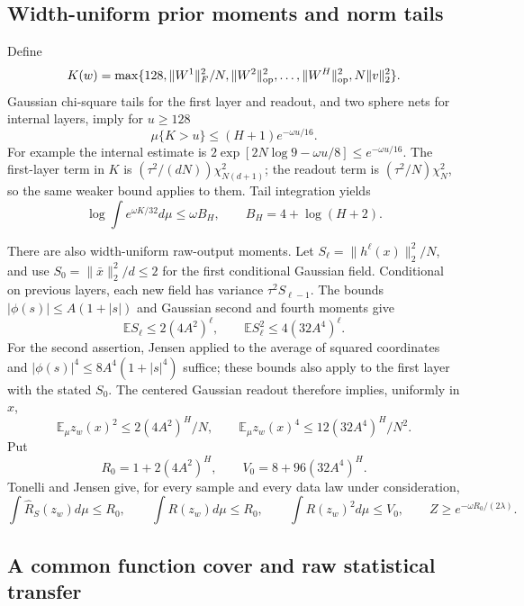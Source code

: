 \subsection{Width-uniform prior moments and norm tails}

Define
\[
 K(w)=\max\{128,\|W^1\|_F^2/N,
          \|W^2\|_{\rm op}^2,\ldots,\|W^H\|_{\rm op}^2,
          N\|v\|_2^2\}.
\]
Gaussian chi-square tails for the first layer and readout, and two
sphere nets for internal layers, imply for $u\geq128$
\begin{equation}
 \mu\{K>u\}\leq(H+1)e^{-\omega u/16}.
 \label{eq:general-activation-norm-tail}
\end{equation}
For example the internal estimate is
$2\exp[2N\log9-\omega u/8]\leq e^{-\omega u/16}$.
The first-layer term in $K$ is $(\tau^2/(dN))\chi^2_{N(d+1)}$;
the readout term is $(\tau^2/N)\chi^2_N$, so the same weaker bound
applies to them.
Tail integration yields
\begin{equation}
 \log\int e^{\omega K/32}d\mu\leq\omega B_H,
 \qquad B_H=4+\log(H+2).
 \label{eq:general-activation-norm-mgf}
\end{equation}

There are also width-uniform raw-output moments.  Let
$S_\ell=\|h^\ell(x)\|_2^2/N$, and use $S_0=\|\bar x\|_2^2/d\leq2$
for the first conditional Gaussian field.  Conditional on previous
layers, each new field has variance $\tau^2S_{\ell-1}$.
The bounds $|\phi(s)|\leq A(1+|s|)$ and Gaussian second and fourth
moments give
\[
 \mathbb E S_\ell\leq2(4A^2)^\ell,
 \qquad \mathbb E S_\ell^2\leq4(32A^4)^\ell.
\]
For the second assertion, Jensen applied to the average of squared
coordinates and $|\phi(s)|^4\leq8A^4(1+|s|^4)$ suffice; these bounds
also apply to the first layer with the stated $S_0$.
The centered Gaussian readout therefore implies, uniformly in $x$,
\[
 \mathbb E_\mu z_w(x)^2\leq 2(4A^2)^H/N,
 \qquad \mathbb E_\mu z_w(x)^4\leq12(32A^4)^H/N^2.
\]
Put
\[
 R_0=1+2(4A^2)^H,\qquad V_0=8+96(32A^4)^H.
\]
Tonelli and Jensen give, for every sample and every data law under
consideration,
\begin{equation}
 \int\widehat R_S(z_w)d\mu\leq R_0,\qquad
 \int R(z_w)d\mu\leq R_0,\qquad
 \int R(z_w)^2d\mu\leq V_0,
 \qquad Z\geq e^{-\omega R_0/(2\lambda)}.
 \label{eq:general-activation-prior-moments}
\end{equation}

\subsection{A common function cover and raw statistical transfer}

